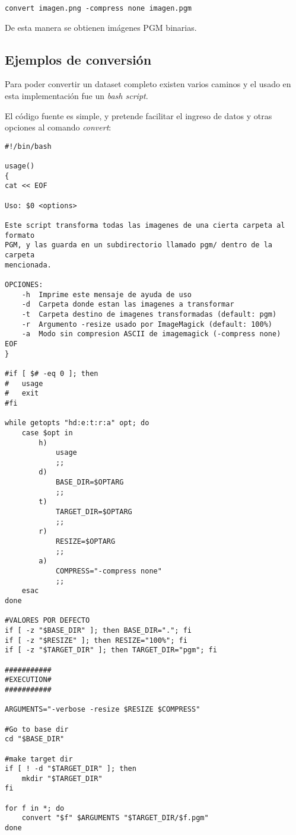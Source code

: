 \begin{verbatim}
convert imagen.png -compress none imagen.pgm
\end{verbatim}

De esta manera se obtienen imágenes PGM binarias.

\subsection{Ejemplos de conversión}
\label{ch:implementacion:sec:ejemplosdeconversion}

Para poder convertir un dataset completo existen varios caminos y el usado en esta implementación fue un \emph{bash script}.

El código fuente es simple, y pretende facilitar el ingreso de datos y otras opciones al comando \emph{convert}:

\begin{scriptsize}
\begin{verbatim}
#!/bin/bash

usage()
{
cat << EOF

Uso: $0 <options>

Este script transforma todas las imagenes de una cierta carpeta al formato
PGM, y las guarda en un subdirectorio llamado pgm/ dentro de la carpeta
mencionada.

OPCIONES:
    -h  Imprime este mensaje de ayuda de uso
    -d  Carpeta donde estan las imagenes a transformar
    -t  Carpeta destino de imagenes transformadas (default: pgm)
    -r  Argumento -resize usado por ImageMagick (default: 100%)
    -a  Modo sin compresion ASCII de imagemagick (-compress none)
EOF
}

#if [ $# -eq 0 ]; then
#   usage
#   exit
#fi

while getopts "hd:e:t:r:a" opt; do
    case $opt in
        h)
            usage
            ;;
        d)
            BASE_DIR=$OPTARG
            ;;
        t)
            TARGET_DIR=$OPTARG
            ;;
        r)
            RESIZE=$OPTARG
            ;;
        a)
            COMPRESS="-compress none"
            ;;
    esac
done

#VALORES POR DEFECTO
if [ -z "$BASE_DIR" ]; then BASE_DIR="."; fi
if [ -z "$RESIZE" ]; then RESIZE="100%"; fi
if [ -z "$TARGET_DIR" ]; then TARGET_DIR="pgm"; fi

###########
#EXECUTION#
###########

ARGUMENTS="-verbose -resize $RESIZE $COMPRESS"

#Go to base dir
cd "$BASE_DIR"

#make target dir
if [ ! -d "$TARGET_DIR" ]; then
    mkdir "$TARGET_DIR"
fi

for f in *; do
    convert "$f" $ARGUMENTS "$TARGET_DIR/$f.pgm"
done
\end{verbatim}
\end{scriptsize}

